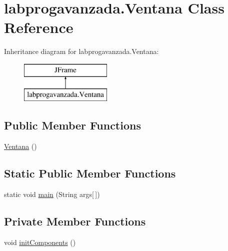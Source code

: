 \hypertarget{classlabprogavanzada_1_1_ventana}{}\section{labprogavanzada.\+Ventana Class Reference}
\label{classlabprogavanzada_1_1_ventana}
Inheritance diagram for labprogavanzada.\+Ventana\+:\begin{figure}[H]
\begin{center}
\leavevmode
\includegraphics[height=2.000000cm]{classlabprogavanzada_1_1_ventana}
\end{center}
\end{figure}
\subsection*{Public Member Functions}
\begin{DoxyCompactItemize}
\item 
\mbox{\hyperlink{classlabprogavanzada_1_1_ventana_a319001fd51267e1ec98672374cb2b2ca}{Ventana}} ()
\end{DoxyCompactItemize}
\subsection*{Static Public Member Functions}
\begin{DoxyCompactItemize}
\item 
static void \mbox{\hyperlink{classlabprogavanzada_1_1_ventana_ac83004124b33aa67c70a33d1f7a274f4}{main}} (String args\mbox{[}$\,$\mbox{]})
\end{DoxyCompactItemize}
\subsection*{Private Member Functions}
\begin{DoxyCompactItemize}
\item 
void \mbox{\hyperlink{classlabprogavanzada_1_1_ventana_aa8e6a326cba22bfe2a249dc70d21848b}{init\+Components}} ()
\end{DoxyCompactItemize}
